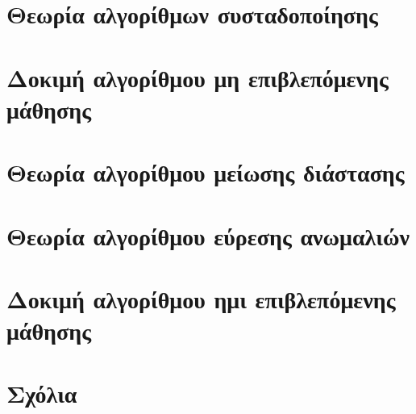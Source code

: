 \section{Θεωρία αλγορίθμων συσταδοποίησης}
\section{Δοκιμή αλγορίθμου μη επιβλεπόμενης μάθησης}
\section{Θεωρία αλγορίθμου μείωσης διάστασης}
\section{Θεωρία αλγορίθμου εύρεσης ανωμαλιών}
\section{Δοκιμή αλγορίθμου ημι επιβλεπόμενης μάθησης}
\section{Σχόλια}